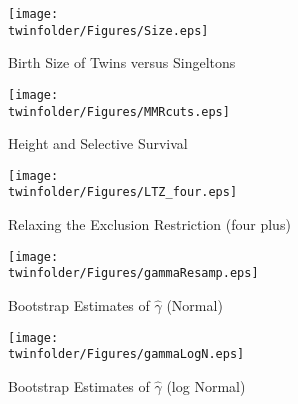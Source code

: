 \setcounter{figure}{0}
\renewcommand{\thefigure}{A\arabic{figure}}

\begin{figure}[htpb!]
\begin{center}
\caption{Birth Size of Twins versus Singeltons}
\label{TWINfig:Size}
\texttt{[image: \\twinfolder/Figures/Size.eps]} 
\end{center}
\end{figure}

\begin{figure}[htpb!]
\begin{center}
\caption{Height and Selective Survival}
\label{TWINfig:survival}
\texttt{[image: \\twinfolder/Figures/MMRcuts.eps]} 
\end{center}
\end{figure}

\begin{figure}[htpb!]
\begin{center}
\caption{Relaxing the Exclusion Restriction (four plus)}
\label{TWINfig:ltz4}
\texttt{[image: \\twinfolder/Figures/LTZ\_four.eps]} 
\end{center}
\end{figure}

\begin{subfigures}
\begin{center}
\begin{figure}
\caption{Bootstrap Estimates of $\hat\gamma$ (Normal)}
\label{TWINfig:gammaBootsN}
\texttt{[image: \\twinfolder/Figures/gammaResamp.eps]} 
\end{figure}

\begin{figure}
\caption{Bootstrap Estimates of $\hat\gamma$ (log Normal)}
\label{TWINfig:gammaBootsL}
\texttt{[image: \\twinfolder/Figures/gammaLogN.eps]} 
\end{figure}
\end{center}
\end{subfigures}
